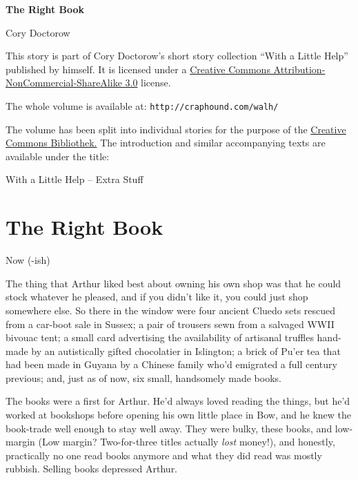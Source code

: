 


\raggedbottom

\begin{center}
\textbf{\huge\textsf{The Right Book}}

\medskip
Cory Doctorow

\end{center}

\bigskip

\begin{flushleft}
This story is part of Cory Doctorow’s short story collection
“With a Little Help” published by himself. It is licensed under a
\href{http://creativecommons.org/licenses/by-nc-sa/}
{Creative Commons Attribution-NonCommercial-ShareAlike 3.0} license.

\bigskip

The whole volume is available at:
\texttt{http://craphound.com/walh/}

\medskip

The volume has been split into individual stories for the purpose of the
\href{http://ccbib.org}{Creative Commons Bibliothek.}
The introduction and similar accompanying texts are available under the 
title:
\end{flushleft}
\begin{center}
With a Little Help -- Extra Stuff
\end{center}

\newpage

\section{The Right Book}

Now (-ish)

The thing that Arthur liked best about owning his own shop was that he 
could stock whatever he pleased, and if you didn't like it, you could 
just shop somewhere else. So there in the window were four ancient 
Cluedo sets rescued from a car-boot sale in Sussex; a pair of trousers 
sewn from a salvaged WWII bivouac tent; a small card advertising the 
availability of artisanal truffles hand-made by an autistically gifted 
chocolatier in Islington; a brick of Pu'er tea that had been made in 
Guyana by a Chinese family who'd emigrated a full century previous; 
and, just as of now, six small, handsomely made books.

The books were a first for Arthur. He'd always loved reading the 
things, but he'd worked at bookshops before opening his own little 
place in Bow, and he knew the book-trade well enough to stay well away. 
They were bulky, these books, and low-margin (Low margin? Two-for-three 
titles actually \emph{lost} money!), and honestly, practically no one 
read books anymore and what they did read was mostly rubbish. Selling 
books depressed Arthur.

